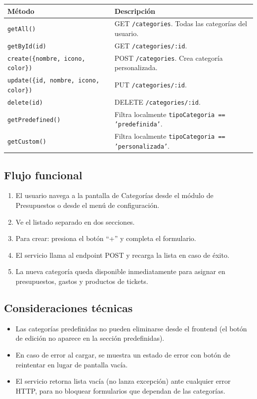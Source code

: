 \documentclass[12pt, letterpaper]{article}
\newcommand{\endpoint}[1]{\texttt{\small\color{azulipn}#1}}
\newcommand{\campo}[1]{\texttt{#1}}
\begin{document}
\begin{tabular}{lp{8.5cm}}
  \toprule
  \textbf{Método} & \textbf{Descripción} \\
  \midrule
  \campo{getAll()} &
    GET \endpoint{/categories}. Todas las categorías del usuario. \\
  \campo{getById(id)} &
    GET \endpoint{/categories/:id}. \\
  \campo{create(\{nombre, icono, color\})} &
    POST \endpoint{/categories}. Crea categoría personalizada. \\
  \campo{update(\{id, nombre, icono, color\})} &
    PUT \endpoint{/categories/:id}. \\
  \campo{delete(id)} &
    DELETE \endpoint{/categories/:id}. \\
  \campo{getPredefined()} &
    Filtra localmente \campo{tipoCategoria == 'predefinida'}. \\
  \campo{getCustom()} &
    Filtra localmente \campo{tipoCategoria == 'personalizada'}. \\
  \bottomrule
\end{tabular}

\subsection{Flujo funcional}

\begin{enumerate}
  \item El usuario navega a la pantalla de Categorías desde el módulo de
        Presupuestos o desde el menú de configuración.
  \item Ve el listado separado en dos secciones.
  \item Para crear: presiona el botón ``+'' y completa el formulario.
  \item El servicio llama al endpoint POST y recarga la lista en caso de éxito.
  \item La nueva categoría queda disponible inmediatamente para asignar en
        presupuestos, gastos y productos de tickets.
\end{enumerate}

\subsection{Consideraciones técnicas}

\begin{itemize}
  \item Las categorías predefinidas no pueden eliminarse desde el frontend
        (el botón de edición no aparece en la sección predefinidas).
  \item En caso de error al cargar, se muestra un estado de error con botón
        de reintentar en lugar de pantalla vacía.
  \item El servicio retorna lista vacía (no lanza excepción) ante cualquier
        error HTTP, para no bloquear formularios que dependan de las categorías.
\end{itemize}
\end{document}
